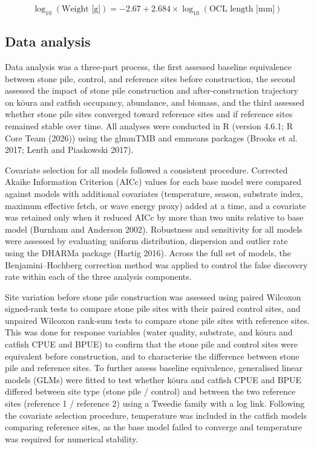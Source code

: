 \documentclass[
  12pt,
  a4paper,
  oneside]{scrbook}
\begin{document}
\[
\log_{10}(\text{Weight [g]}) = -2.67 + 2.684 \times \log_{10}(\text{OCL length [mm]})
\]

\subsection{Data analysis}\label{data-analysis-2}

Data analysis was a three-part process, the first assessed baseline
equivalence between stone pile, control, and reference sites before
construction, the second assessed the impact of stone pile construction
and after-construction trajectory on kōura and catfish occupancy,
abundance, and biomass, and the third assessed whether stone pile sites
converged toward reference sites and if reference sites remained stable
over time. All analyses were conducted in R (version 4.6.1; R Core Team
(2026)) using the glmmTMB and emmeans packages (Brooks et al. 2017;
Lenth and Piaskowski 2017).

Covariate selection for all models followed a consistent procedure.
Corrected Akaike Information Criterion (AICc) values for each base model
were compared against models with additional covariates (temperature,
season, substrate index, maximum effective fetch, or wave energy proxy)
added at a time, and a covariate was retained only when it reduced AICc
by more than two units relative to base model (Burnham and Anderson
2002). Robustness and sensitivity for all models were assessed by
evaluating uniform distribution, dispersion and outlier rate using the
DHARMa package (Hartig 2016). Across the full set of models, the
Benjamini--Hochberg correction method was applied to control the false
discovery rate within each of the three analysis components.

Site variation before stone pile construction was assessed using paired
Wilcoxon signed-rank tests to compare stone pile sites with their paired
control sites, and unpaired Wilcoxon rank-sum tests to compare stone
pile sites with reference sites. This was done for response variables
(water quality, substrate, and kōura and catfish CPUE and BPUE) to
confirm that the stone pile and control sites were equivalent before
construction, and to characterise the difference between stone pile and
reference sites. To further assess baseline equivalence, generalised
linear models (GLMs) were fitted to test whether kōura and catfish CPUE
and BPUE differed between site type (stone pile / control) and between
the two reference sites (reference 1 / reference 2) using a Tweedie
family with a log link. Following the covariate selection procedure,
temperature was included in the catfish models comparing reference
sites, as the base model failed to converge and temperature was required
for numerical stability.
\end{document}

